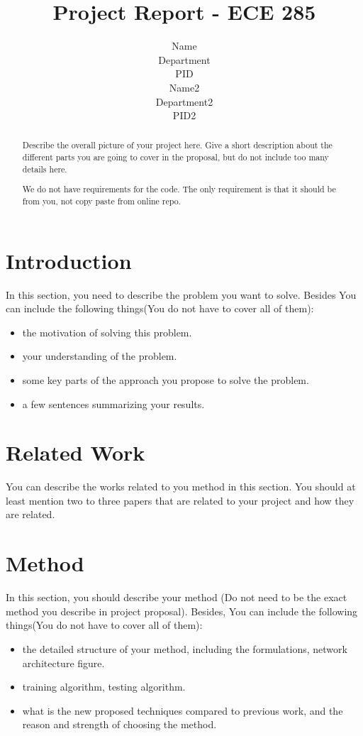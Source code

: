 \documentclass{article}
\title{Project Report - ECE 285}
\author{%
  Name \\
  Department\\
  PID\\
  \And
  Name2 \\
  Department2 \\
  PID2 \\
}
\begin{document}
\maketitle

\begin{abstract}
    Describe the overall picture of your project here. Give a short description about the different parts you are going to cover in the proposal, but do not include too many details here.
    
    We do not have requirements for the code. The only requirement is that it should be from you, not copy paste from online repo.
    

\end{abstract}

\section{Introduction}

In this section, you need to describe the problem you want to solve. Besides You can include the following things(You do not have to cover all of them):
\begin{itemize}
    \item the motivation of solving this problem.
    \item your understanding of the problem.
    \item some key parts of the approach you propose to solve the problem.
    \item a few sentences summarizing your results.
\end{itemize}

\section{Related Work}

You can describe the works related to you method in this section. You should at least mention two to three papers that are related to your project and how they are related.

\section{Method}

In this section, you should describe your method (Do not need to be the exact method you describe in project proposal). Besides, You can include the following things(You do not have to cover all of them): 

\begin{itemize}
    \item the detailed structure of your method, including the formulations, network architecture figure.
    \item training algorithm, testing algorithm.
    \item what is the new proposed techniques compared to previous work, and the reason and strength of choosing the method.
\end{itemize}
\end{document}
